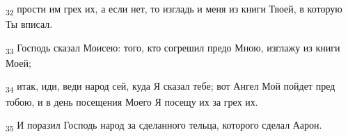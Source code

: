 \begin{tcolorbox}
\textsubscript{32} прости им грех их, а если нет, то изгладь и меня из книги Твоей, в которую Ты вписал.
\end{tcolorbox}
\begin{tcolorbox}
\textsubscript{33} Господь сказал Моисею: того, кто согрешил предо Мною, изглажу из книги Моей;
\end{tcolorbox}
\begin{tcolorbox}
\textsubscript{34} итак, иди, веди народ сей, куда Я сказал тебе; вот Ангел Мой пойдет пред тобою, и в день посещения Моего Я посещу их за грех их.
\end{tcolorbox}
\begin{tcolorbox}
\textsubscript{35} И поразил Господь народ за сделанного тельца, которого сделал Аарон.
\end{tcolorbox}
